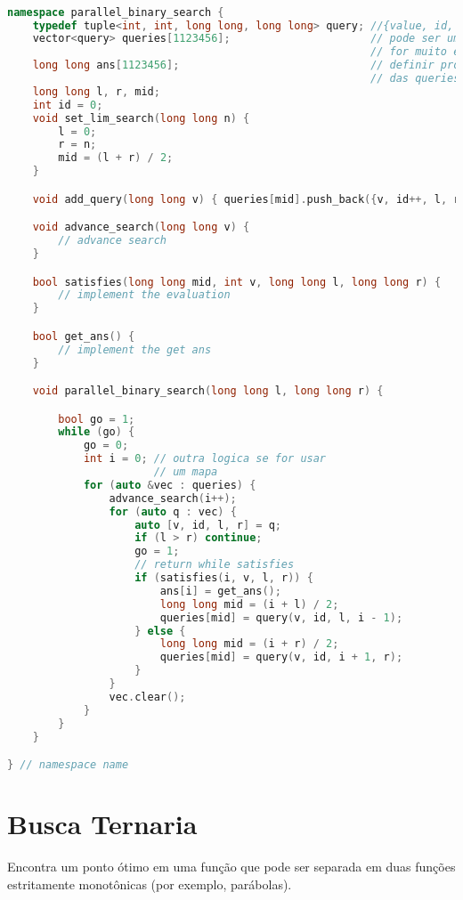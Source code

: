 \documentclass[10pt, a4paper, oneside]{book}
\begin{document}
\begin{lstlisting}[language=C++]

namespace parallel_binary_search {
    typedef tuple<int, int, long long, long long> query; //{value, id, l, r}
    vector<query> queries[1123456];                      // pode ser um mapa se
                                                         // for muito esparso
    long long ans[1123456];                              // definir pro tamanho
                                                         // das queries
    long long l, r, mid;
    int id = 0;
    void set_lim_search(long long n) {
        l = 0;
        r = n;
        mid = (l + r) / 2;
    }

    void add_query(long long v) { queries[mid].push_back({v, id++, l, r}); }

    void advance_search(long long v) {
        // advance search
    }

    bool satisfies(long long mid, int v, long long l, long long r) {
        // implement the evaluation
    }

    bool get_ans() {
        // implement the get ans
    }

    void parallel_binary_search(long long l, long long r) {

        bool go = 1;
        while (go) {
            go = 0;
            int i = 0; // outra logica se for usar
                       // um mapa
            for (auto &vec : queries) {
                advance_search(i++);
                for (auto q : vec) {
                    auto [v, id, l, r] = q;
                    if (l > r) continue;
                    go = 1;
                    // return while satisfies
                    if (satisfies(i, v, l, r)) {
                        ans[i] = get_ans();
                        long long mid = (i + l) / 2;
                        queries[mid] = query(v, id, l, i - 1);
                    } else {
                        long long mid = (i + r) / 2;
                        queries[mid] = query(v, id, i + 1, r);
                    }
                }
                vec.clear();
            }
        }
    }

} // namespace name
\end{lstlisting}
\hfill

\section{Busca Ternaria}


Encontra um ponto ótimo em uma função que pode ser separada em duas funções estritamente monotônicas (por exemplo, parábolas).
\end{document}
